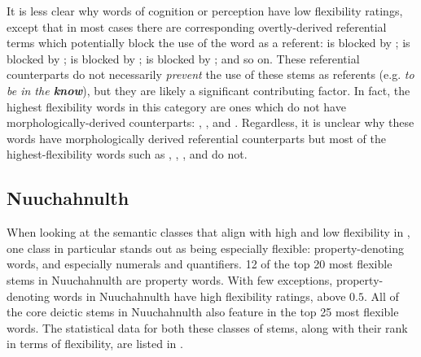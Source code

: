 It is less clear why words of cognition or perception have low flexibility ratings, except that in most cases there are corresponding overtly-derived referential terms which potentially block the use of the word as a referent:  is blocked by ;  is blocked by ;  is blocked by ;  is blocked by ; and so on. These referential counterparts do not necessarily \emph{prevent} the use of these stems as referents (e.g. \textit{to be in the \textbf{know}}), but they are likely a significant contributing factor. In fact, the highest flexibility words in this category are ones which do not have morphologically-derived counterparts: , , and . Regardless, it is unclear why these words have morphologically derived referential counterparts but most of the highest-flexibility words such as , , , and  do not.

\subsection{Nuuchahnulth}
\label{sec:4.6.2}

When looking at the semantic classes that align with high and low flexibility in , one class in particular stands out as being especially flexible: property-denoting words, and especially numerals and quantifiers. 12 of the top 20 most flexible stems in Nuuchahnulth are property words. With few exceptions, property-denoting words in Nuuchahnulth have high flexibility ratings, above $0.5$. All of the core deictic stems in Nuuchahnulth also feature in the top 25 most flexible words. The statistical data for both these classes of stems, along with their rank in terms of flexibility, are listed in .

